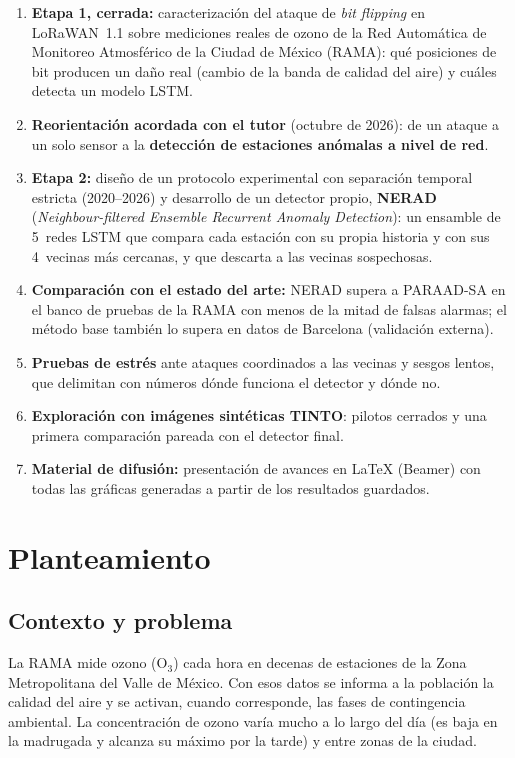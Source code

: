 \documentclass[11pt, letterpaper]{article}
\begin{document}
\begin{enumerate}
  \item \textbf{Etapa 1, cerrada:} caracterización del ataque de \emph{bit flipping} en
    LoRaWAN~1.1 sobre mediciones reales de ozono de la Red Automática de Monitoreo
    Atmosférico de la Ciudad de México (RAMA): qué posiciones de bit producen un daño real
    (cambio de la banda de calidad del aire) y cuáles detecta un modelo LSTM.
  \item \textbf{Reorientación acordada con el tutor} (octubre de 2026): de un ataque a un
    solo sensor a la \textbf{detección de estaciones anómalas a nivel de red}.
  \item \textbf{Etapa 2:} diseño de un protocolo experimental con separación temporal
    estricta (2020--2026) y desarrollo de un detector propio, \textbf{NERAD}
    (\emph{Neighbour-filtered Ensemble Recurrent Anomaly Detection}): un ensamble de
    5~redes LSTM que compara cada estación con su propia historia y con sus 4~vecinas más
    cercanas, y que descarta a las vecinas sospechosas.
  \item \textbf{Comparación con el estado del arte:} NERAD supera a PARAAD-SA
    \cite{allka2024paraad} en el banco de pruebas de la RAMA con menos de la mitad de
    falsas alarmas; el método base también lo supera en datos de Barcelona (validación
    externa).
  \item \textbf{Pruebas de estrés} ante ataques coordinados a las vecinas y sesgos lentos,
    que delimitan con números dónde funciona el detector y dónde no.
  \item \textbf{Exploración con imágenes sintéticas TINTO}: pilotos cerrados y una primera
    comparación pareada con el detector final.
  \item \textbf{Material de difusión:} presentación de avances en \LaTeX{} (Beamer) con
    todas las gráficas generadas a partir de los resultados guardados.
\end{enumerate}

\section{Planteamiento}

\subsection{Contexto y problema}

La RAMA mide ozono (O$_{\text{3}}$) cada hora en decenas de estaciones de la Zona
Metropolitana del Valle de México. Con esos datos se informa a la población la calidad del
aire y se activan, cuando corresponde, las fases de contingencia ambiental. La
concentración de ozono varía mucho a lo largo del día (es baja en la madrugada y alcanza
su máximo por la tarde) y entre zonas de la ciudad.
\end{document}
